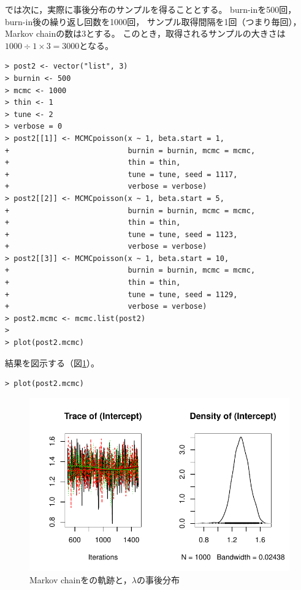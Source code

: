 \documentclass[11pt,uplatex]{jsarticle}
\begin{document}
では次に，実際に事後分布のサンプルを得ることとする。
burn-inを500回，burn-in後の繰り返し回数を1000回，
サンプル取得間隔を1回（つまり毎回），
Markov chainの数は3とする。
このとき，取得されるサンプルの大きさは$1000\div1\times3=3000$となる。

\begin{lstlisting}
> post2 <- vector("list", 3)
> burnin <- 500
> mcmc <- 1000
> thin <- 1
> tune <- 2
> verbose = 0
> post2[[1]] <- MCMCpoisson(x ~ 1, beta.start = 1,
+                           burnin = burnin, mcmc = mcmc,
+                           thin = thin,
+                           tune = tune, seed = 1117,
+                           verbose = verbose)
> post2[[2]] <- MCMCpoisson(x ~ 1, beta.start = 5,
+                           burnin = burnin, mcmc = mcmc,
+                           thin = thin,
+                           tune = tune, seed = 1123,
+                           verbose = verbose)
> post2[[3]] <- MCMCpoisson(x ~ 1, beta.start = 10,
+                           burnin = burnin, mcmc = mcmc,
+                           thin = thin,
+                           tune = tune, seed = 1129,
+                           verbose = verbose)
> post2.mcmc <- mcmc.list(post2)
> 
> plot(post2.mcmc)
\end{lstlisting}

結果を図示する（図\ref{MCMC_plot}）。
\begin{lstlisting}
> plot(post2.mcmc)
\end{lstlisting}

\begin{figure}[hbtp]
  \begin{center}
    \includegraphics[bb=0 0 360 240, clip, width=260 bp]{example1-3.pdf}
  \end{center}
  \caption{Markov chainをの軌跡と，$\lambda$の事後分布}
  \label{MCMC_plot}
\end{figure}
\end{document}
